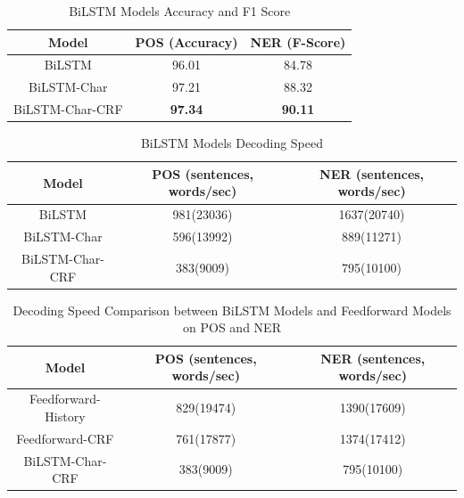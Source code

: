 \begin{table}[]
\centering
\caption{BiLSTM Models Accuracy and F1 Score}
\label{table:lstm-table1}
\begin{tabular}{|c|c|c|}
\hline
Model         & POS (Accuracy)  & NER (F-Score)       \\ \hline
BiLSTM  & 96.01     & 84.78                             \\ \hline
BiLSTM-Char & 97.21 & 88.32             \\ \hline
BiLSTM-Char-CRF & \textbf{97.34}  & \textbf{90.11}             \\ \hline
\end{tabular}
\end{table}

\begin{table}[]
\centering
\caption{BiLSTM Models Decoding Speed}
\label{table:lstm-table2}
\begin{tabular}{|c|c|c|}
\hline
Model       & POS  (sentences, words/sec)  & NER  (sentences, words/sec)      \\ \hline
BiLSTM             & 981(23036)     & 1637(20740)       \\ \hline
BiLSTM-Char        & 596(13992)  & 889(11271)             \\ \hline
BiLSTM-Char-CRF    & 383(9009)  & 795(10100)         \\ \hline
\end{tabular}
\end{table}

\begin{table}[]
\centering
\caption{Decoding Speed Comparison between BiLSTM Models and Feedforward Models on POS and NER}
\label{table:lstm-table3}
\begin{tabular}{|c|c|c|}
\hline
Model       & POS  (sentences, words/sec)  & NER  (sentences, words/sec)      \\ \hline
Feedforward-History            & 829(19474)     & 1390(17609)       \\ \hline
Feedforward-CRF        & 761(17877)  & 1374(17412)             \\ \hline
BiLSTM-Char-CRF    & 383(9009)  & 795(10100)         \\ \hline
\end{tabular}
\end{table}

